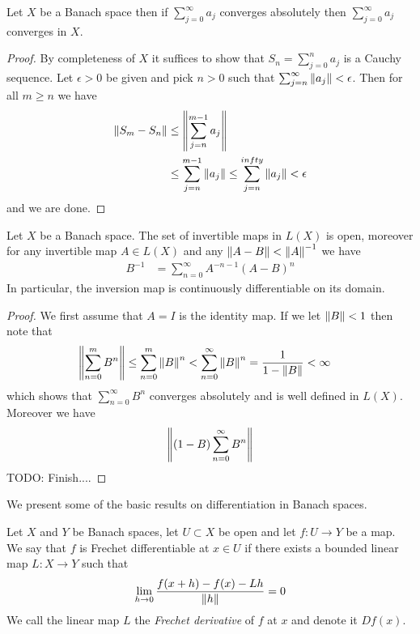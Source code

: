 \begin{prop}\label{banach:AbsoluteConvergenceOfSeriesImpliesConvergence}Let $X$ be a Banach space then if $\sum_{j=0}^\infty a_j$
  converges absolutely then $\sum_{j=0}^\infty a_j$ converges in $X$.
\end{prop}
\begin{proof}
By completeness of $X$ it suffices to show that $S_n = \sum_{j=0}^n
a_j$ is a Cauchy sequence.  Let $\epsilon > 0$ be given and pick $n >
0$ such that $\sum_{j=n}^\infty \left \lVert a_j \right \rVert < \epsilon$.  Then for all
$m \geq n$ we have
\begin{align*}
\left \lVert S_m - S_n \right \rVert &\leq \left \lVert \sum_{j=n}^{m-1} a_j \right \rVert \\
&\leq \sum_{j=n}^{m-1}\left \lVert  a_j \right \rVert \leq \sum_{j=n}^{infty}\left \lVert  a_j \right \rVert < \epsilon
\end{align*}
and we are done.
\end{proof}

\begin{prop}\label{banach:InvertibleMapsOpen}Let $X$ be a Banach space.  The set of invertible maps in $L(X)$ is open, moreover
  for any invertible map $A \in L(X)$ and any $\left \lVert A-B \right \rVert <
  \left \lVert A \right \rVert^{-1}$ we have 
\begin{align*}
B^{-1} &= \sum_{n=0}^\infty A^{-n-1} (A-B)^n 
\end{align*}
In particular, the inversion map is continuously differentiable on its domain.
\end{prop}
\begin{proof}
We first assume that $A= I$ is the identity map.  If we let $\left \lVert B \right \rVert
< 1$ then note that 
\begin{align*}
\left \lVert \sum_{n=0}^m B^n \right \rVert &\leq \sum_{n=0}^m \left \lVert  B \right \rVert^n <
                          \sum_{n=0}^\infty \left \lVert  B \right \rVert^n =
                          \frac{1}{1-\left \lVert B \right \rVert} < \infty
\end{align*}
which shows that $\sum_{n=0}^\infty B^n$ converges absolutely and
is well defined in $L(X)$.  Moreover we have
\begin{align*}
\left \lVert (1- B) \sum_{n=0}^\infty B^n  \right \rVert
\end{align*}
TODO: Finish....
\end{proof}

We present some of the basic results on differentiation in Banach
spaces.

\begin{defn}Let $X$ and $Y$ be Banach spaces, let $U \subset X$ be
  open and let $f : U \to Y$ be
  a map.  We say that $f$ is Frechet differentiable at $x \in U$ if there
  exists a bounded linear map $L : X \to Y$ such that
\begin{align*}
\lim_{h \to 0} \frac{f(x + h) - f(x) -Lh}{\left \lVert h \right \rVert} = 0
\end{align*}
We call the linear map $L$ the \emph{Frechet derivative} of $f$ at $x$
and denote it $Df(x)$.
\end{defn}


